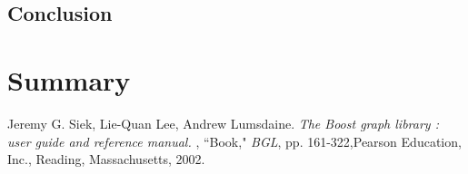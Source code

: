 \documentclass[a4paper,english]{book}
\begin{document}
\section{Conclusion}
\chapter{Summary}
\begin{thebibliography}{12}
Jeremy G. Siek,
Lie-Quan Lee, Andrew Lumsdaine.
\textit{The Boost graph library : user guide and reference manual.} , ``Book," \emph{BGL}, pp. 161-322,Pearson Education, Inc., Reading, Massachusetts, 2002.
\end{thebibliography}
\end{document}
